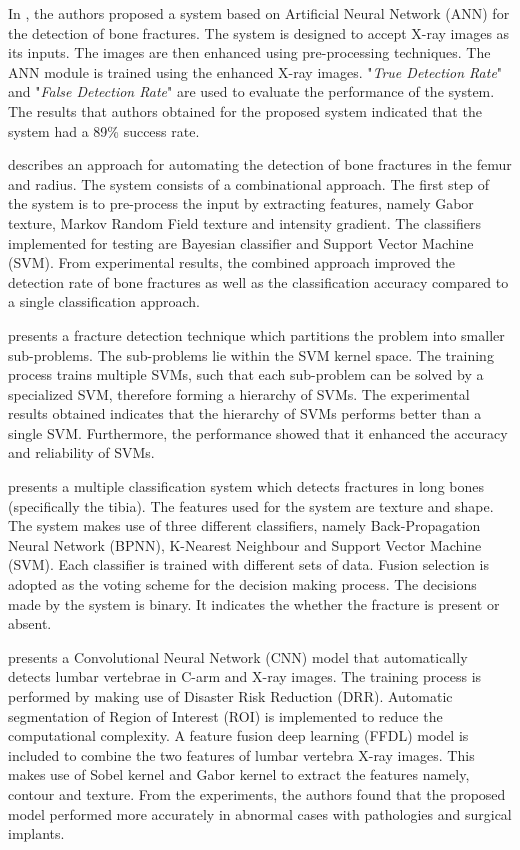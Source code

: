 \documentclass[11pt]{article}
\begin{document}
	In \cite{ComputerAidedBoneFractureDetection}, the authors proposed a system based on Artificial Neural Network (ANN) for the detection of bone fractures. The system is designed to accept X-ray images as its inputs. The images are then enhanced using pre-processing techniques. The ANN module is trained using the enhanced X-ray images. "\textit{True Detection Rate}" and "\textit{False Detection Rate}" are used to evaluate the performance of the system. The results that authors obtained for the proposed system indicated that the system had a 89\% success rate.
	
	\cite{lim2004detection} describes an approach for automating the detection of bone fractures in the femur and radius. The system consists of a combinational approach. The first step of the system is to pre-process the input by extracting features, namely Gabor texture, Markov Random Field texture and intensity gradient. The classifiers implemented for testing are Bayesian classifier and Support Vector Machine (SVM). From experimental results, the combined approach improved the detection rate of bone fractures as well as the classification accuracy compared to a single classification approach.
	
	\cite{JoshuaCongfuHe2007} presents a fracture detection technique which partitions the problem into smaller sub-problems. The sub-problems lie within the SVM kernel space. The training process trains multiple SVMs, such that each sub-problem can be solved by a specialized SVM, therefore forming a hierarchy of SVMs. The experimental results obtained indicates that the hierarchy of SVMs performs better than a single SVM. Furthermore, the performance showed that it enhanced the accuracy and reliability of SVMs.
	
	\cite{multiple_classification} presents a multiple classification system which detects fractures in long bones (specifically the tibia). The features used for the system are texture and shape. The system makes use of three different classifiers, namely Back-Propagation Neural Network (BPNN), K-Nearest Neighbour and Support Vector Machine (SVM). Each classifier is trained with different sets of data. Fusion selection is adopted as the voting scheme for the decision making process. The decisions made by the system is binary. It indicates the whether the fracture is present or absent.
	
	\cite{Li_Liang2016} presents a Convolutional Neural Network (CNN) model that automatically detects lumbar vertebrae in C-arm and X-ray images. The training process is performed by making use of Disaster Risk Reduction (DRR). Automatic segmentation of Region of Interest (ROI) is implemented to reduce the computational complexity. A feature fusion deep learning (FFDL) model is included to combine the two features of lumbar vertebra X-ray images. This makes use of Sobel kernel and Gabor kernel to extract the features namely, contour and texture. From the experiments, the authors found that the proposed model performed more accurately in abnormal cases with pathologies and surgical implants. 
	
\end{document}
